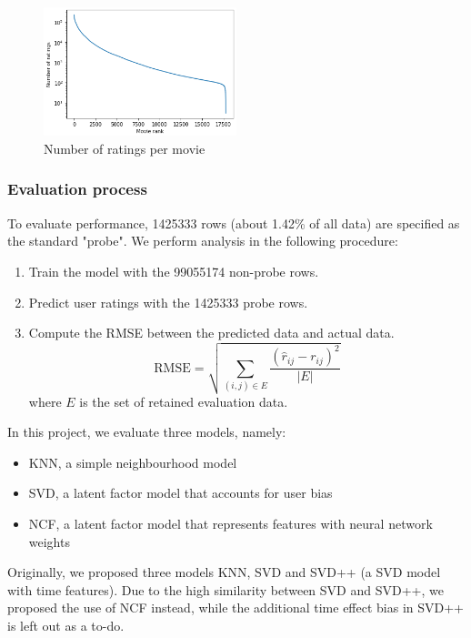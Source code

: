 \documentclass[final]{cvpr}
\begin{document}
\begin{figure}
	\includegraphics[width=0.5\textwidth]{screenshot20210422223229.png}
	\caption{Number of ratings per movie}
	\label{fig:movie-rating-freq}
\end{figure}

\subsubsection{Evaluation process}
To evaluate performance, 1425333 rows (about 1.42\% of all data) are specified as the standard "probe".
We perform analysis in the following procedure:

\begin{enumerate}
	\item Train the model with the 99055174 non-probe rows.
	\item Predict user ratings with the 1425333 probe rows.
	\item Compute the \ac{RMSE} between the predicted data and actual data.
    $$ \text{RMSE} = \sqrt{\sum_{(i, j) \in E} \frac{{(\hat r_{ij} - r_{ij})}^2}{\left| E \right|}} $$
where $E$ is the set of retained evaluation data.
\end{enumerate}


In this project, we evaluate three models, namely:

\begin{itemize}
	\item \ac{KNN}, a simple neighbourhood model
	\item \ac{SVD}, a latent factor model that accounts for user bias
	\item \ac{NCF}, a latent factor model that represents features with neural network weights
\end{itemize}

Originally, we proposed three models KNN, SVD and SVD++ (a SVD model with time features).
Due to the high similarity between SVD and SVD++,
we proposed the use of NCF instead,
while the additional time effect bias in SVD++ is left out as a to-do.
\end{document}

